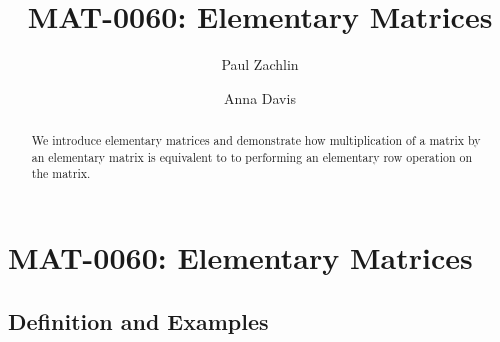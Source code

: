 \documentclass{ximera}
\author{Paul Zachlin \and Anna Davis} \title{MAT-0060: Elementary Matrices} \license{CC-BY 4.0}
\begin{document}
\begin{abstract}
 We introduce elementary matrices and demonstrate how multiplication of a matrix by an elementary matrix is equivalent to to performing an elementary row operation on the matrix.
\end{abstract}
\maketitle

\section*{MAT-0060: Elementary Matrices}
\subsection*{Definition and Examples}
\end{document}
